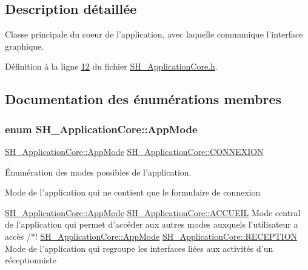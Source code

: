 \subsection{Description détaillée}
Classe principale du coeur de l'application, avec laquelle communique l'interface graphique. 

Définition à la ligne \hyperlink{SH__ApplicationCore_8h_source_l00012}{12} du fichier \hyperlink{SH__ApplicationCore_8h_source}{S\-H\-\_\-\-Application\-Core.\-h}.



\subsection{Documentation des énumérations membres}
\hypertarget{classSH__ApplicationCore_a6b93b2f83a290305f282616eb2935899}{
\subsubsection[{App\-Mode}]{\setlength{\rightskip}{0pt plus 5cm}enum {\bf S\-H\-\_\-\-Application\-Core\-::\-App\-Mode}}}\label{classSH__ApplicationCore_a6b93b2f83a290305f282616eb2935899}


\hyperlink{classSH__ApplicationCore_a6b93b2f83a290305f282616eb2935899}{S\-H\-\_\-\-Application\-Core\-::\-App\-Mode} \hyperlink{classSH__ApplicationCore_a6b93b2f83a290305f282616eb2935899a3594de687d70f634e91ef60a63b74172}{S\-H\-\_\-\-Application\-Core\-::\-C\-O\-N\-N\-E\-X\-I\-O\-N} 

Énumération des modes possibles de l'application.

Mode de l'application qui ne contient que le formulaire de connexion

\hyperlink{classSH__ApplicationCore_a6b93b2f83a290305f282616eb2935899}{S\-H\-\_\-\-Application\-Core\-::\-App\-Mode} \hyperlink{classSH__ApplicationCore_a6b93b2f83a290305f282616eb2935899a1892b908076a0887805e80f590ecdef4}{S\-H\-\_\-\-Application\-Core\-::\-A\-C\-C\-U\-E\-I\-L} Mode central de l'application qui permet d'accéder aux autres modes auxquels l'utilisateur a accès /$\ast$!  \hyperlink{classSH__ApplicationCore_a6b93b2f83a290305f282616eb2935899}{S\-H\-\_\-\-Application\-Core\-::\-App\-Mode} \hyperlink{classSH__ApplicationCore_a6b93b2f83a290305f282616eb2935899a16687d65e8feb3b768ff655d73a45916}{S\-H\-\_\-\-Application\-Core\-::\-R\-E\-C\-E\-P\-T\-I\-O\-N} Mode de l'application qui regroupe les interfaces liées aux activités d'un réceptionniste

